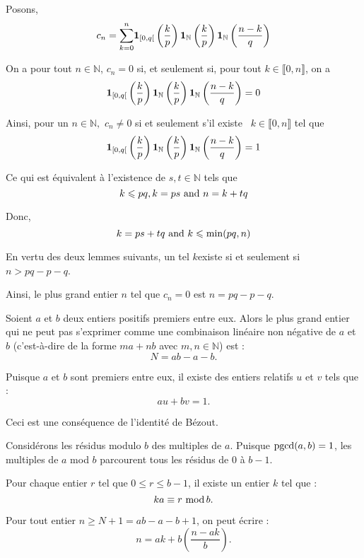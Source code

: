 Posons,
\[ c_n = \underset{k = 0}{\overset{n}{\sum}} \boldsymbol{1}_{[0, q [} \left(
   \frac{k}{p} \right) \boldsymbol{1}_{\mathbb{N}} \left( \frac{k}{p} \right)
   \boldsymbol{1}_{\mathbb{N}} \left( \frac{n - k}{q} \right) \]


On a pour tout $n \in \mathbb{N}$, $c_n = 0$ si, et seulement si, pour tout $k
\in \llbracket 0, n \rrbracket$, on a
\[ \boldsymbol{1}_{[0, q [} \left( \frac{k}{p} \right) \boldsymbol{1}_{\mathbb{N}}
   \left( \frac{k}{p} \right) \boldsymbol{1}_{\mathbb{N}} \left( \frac{n - k}{q}
   \right) = 0 \]


Ainsi, pour un $n \in \mathbb{N},$ $c_n \neq 0$ si et seulement s'il existe \
$k \in \llbracket 0, n \rrbracket$ tel que
\[ \boldsymbol{1}_{[0, q [} \left( \frac{k}{p} \right)
   \boldsymbol{1}_{\mathbb{N}} \left( \frac{k}{p} \right)
   \boldsymbol{1}_{\mathbb{N}} \left( \frac{n - k}{q} \right) = 1 \]


Ce qui est {\'e}quivalent {\`a} l'existence de $s, t \in \mathbb{N}$ tels que
\[ k \leqslant p q, k = p s \text{ and } n = k + t q \]


Donc,
\[ k = p s + t q \text{ and } k \leqslant \min (p q, n) \]


En vertu des deux lemmes suivants, un tel $k$existe si et seulement si $n > p
q - p - q$.

Ainsi, le plus grand entier $n$ tel que $c_n = 0$ est $n = p q - p - q$.


Soient $a$ et $b$ deux entiers positifs premiers entre eux. Alors le plus
grand entier qui ne peut pas s'exprimer comme une combinaison lin{\'e}aire non
n{\'e}gative de $a$ et $b$ (c'est-{\`a}-dire de la forme $ma + nb$ avec $m, n
\in \mathbb{N}$) est :
\[ N = ab - a - b. \]



Puisque $a$ et $b$ sont premiers entre eux, il existe des entiers relatifs $u$
et $v$ tels que :
\[ au + bv = 1. \]


Ceci est une cons{\'e}quence de l'identit{\'e} de B{\'e}zout.

Consid{\'e}rons les r{\'e}sidus modulo $b$ des multiples de $a$. Puisque
$\operatorname{pgcd} (a, b) = 1$, les multiples de $a$ mod $b$ parcourent tous les
r{\'e}sidus de $0$ {\`a} $b - 1$.

Pour chaque entier $r$ tel que $0 \leq r \leq b - 1$, il existe un entier $k$
tel que :
\[ ka \equiv r \, \operatorname{mod} b. \]


Pour tout entier $n \geq N + 1 = ab - a - b + 1$, on peut {\'e}crire :
\[ n = a k + b \left( \frac{n - ak}{b} \right) . \]


